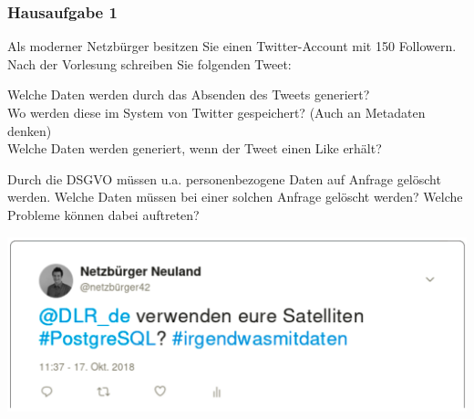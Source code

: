 \begin{frame}
	\frametitle{Hausaufgabe 1}
	\vspace{0.25cm}

	\begin{multicols}{2}
		Als moderner Netzbürger besitzen Sie einen Twitter-Account mit 150 Followern. Nach der Vorlesung schreiben Sie
		folgenden Tweet:

		\begin{enumerate}[a)]
			 {
			\item Welche Daten werden durch das Absenden des Tweets generiert? \\
			      Wo werden diese im System von Twitter gespeichert? (Auch an Metadaten denken) \\
			      Welche Daten werden generiert, wenn der Tweet einen Like erhält?
			      }
			      \setcounter{enumi}{1}
			\item<3-> Durch die DSGVO müssen u.a. personenbezogene Daten auf Anfrage gelöscht werden.
			      Welche Daten müssen bei einer solchen Anfrage gelöscht werden?
			      Welche Probleme können dabei auftreten?
		\end{enumerate}
		\vfill\columnbreak
		\begin{center}
			\includegraphics[height=.2\paperheight]{./tweet.png}
		\end{center}
		\vspace{-1cm}


\end{multicols}
\end{frame}

